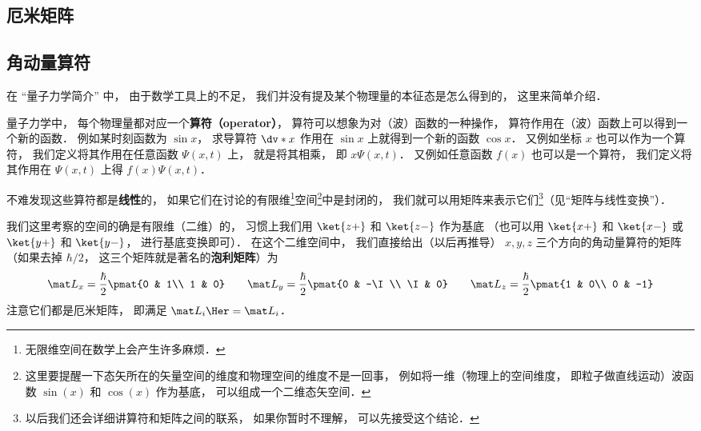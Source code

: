 \subsection{厄米矩阵}






\subsection{角动量算符}
在 “量子力学简介” 中， 由于数学工具上的不足， 我们并没有提及某个物理量的本征态是怎么得到的， 这里来简单介绍．

量子力学中， 每个物理量都对应一个\textbf{算符（operator）}， 算符可以想象为对（波）函数的一种操作， 算符作用在（波）函数上可以得到一个新的函数． 例如某时刻函数为 $\sin x$， 求导算符 $\dv*{x}$ 作用在 $\sin x$ 上就得到一个新的函数 $\cos x$． 又例如坐标 $x$ 也可以作为一个算符， 我们定义将其作用在任意函数 $\Psi(x, t)$ 上， 就是将其相乘， 即 $x\Psi(x, t)$． 又例如任意函数 $f(x)$ 也可以是一个算符， 我们定义将其作用在 $\Psi(x, t)$ 上得 $f(x)\Psi(x, t)$．

不难发现这些算符都是\textbf{线性}的， 如果它们在讨论的有限维\footnote{无限维空间在数学上会产生许多麻烦．}空间\footnote{这里要提醒一下态矢所在的矢量空间的维度和物理空间的维度不是一回事， 例如将一维（物理上的空间维度， 即粒子做直线运动）波函数 $\sin(x)$ 和 $\cos(x)$ 作为基底， 可以组成一个二维态矢空间．}中是封闭的， 我们就可以用矩阵来表示它们\footnote{以后我们还会详细讲算符和矩阵之间的联系， 如果你暂时不理解， 可以先接受这个结论．}（见“矩阵与线性变换”）．%

我们这里考察的空间的确是有限维（二维）的， 习惯上我们用 $\ket{z+}$ 和 $\ket{z-}$ 作为基底 （也可以用 $\ket{x+}$ 和 $\ket{x-}$ 或 $\ket{y+}$ 和 $\ket{y-}$， 进行基底变换即可）． 在这个二维空间中， 我们直接给出（以后再推导） $x, y, z$ 三个方向的角动量算符的矩阵（如果去掉 $\hbar/2$， 这三个矩阵就是著名的\textbf{泡利矩阵}）为
\begin{equation}
\mat L_x = \frac{\hbar}{2}\pmat{0 & 1\\ 1 & 0}
\qquad
\mat L_y = \frac{\hbar}{2}\pmat{0 & -\I \\ \I & 0}
\qquad
\mat L_z = \frac{\hbar}{2}\pmat{1 & 0\\ 0 & -1}
\end{equation}
注意它们都是厄米矩阵， 即满足 $\mat L_i\Her = \mat L_i$．%

